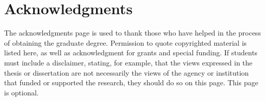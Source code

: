 \chapter*{Acknowledgments} \label{acknowledgments}

The acknowledgments page is used to thank those who have helped in the
process of obtaining the graduate degree. Permission to quote copyrighted
material is listed here, as well as acknowledgment for grants and
special funding. If students must include a disclaimer, stating, for example,
that the views expressed in the thesis or dissertation are not necessarily
the views of the agency or institution that funded or supported the research,
they should do so on this page. This page is optional.

